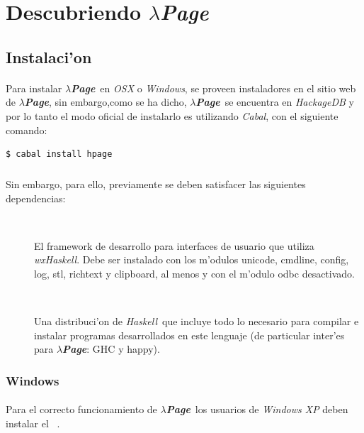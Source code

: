 \documentclass[a4paper]{article}
\newcommand{\haskell}{\textsl{Haskell}}
\newcommand{\hpage}{\textbf{\textsl{$\lambda$Page}}}
\newcommand{\cabal}{\textsl{Cabal}}
\begin{document}
\section{Descubriendo \hpage}
\subsection{Instalaci'on}
\begin{epigraphs}
\end{epigraphs}
\paragraph{}Para instalar \hpage\ en \textsl{OSX} o \textsl{Windows}, se proveen instaladores en el sitio web de \hpage, sin embargo,como se ha dicho, \hpage\ se encuentra en \textsl{HackageDB} y por lo tanto el modo oficial de instalarlo es utilizando \cabal, con el siguiente comando:
\lstset{language=sh, frame=single, tabsize=2}
\begin{lstlisting}
$ cabal install hpage
\end{lstlisting}
\subparagraph{}Sin embargo, para ello, previamente se deben satisfacer las siguientes dependencias:
\begin{description}
	\item[~\cite{wxwidgets}] El framework de desarrollo para interfaces de usuario que utiliza \textsl{wxHaskell}.  Debe ser instalado con los m'odulos unicode, cmdline, config, log, stl, richtext y clipboard, al menos y con el m'odulo odbc desactivado.
	\item[~\cite{platform}] Una distribuci'on de \haskell\ que incluye todo lo necesario para compilar e instalar programas desarrollados en este lenguaje (de particular inter'es para \hpage: GHC y happy).
\end{description}
\subsubsection{Windows}
\paragraph{}Para el correcto funcionamiento de \hpage\ los usuarios de \textsl{Windows XP} deben instalar el ~\cite{cppsp1}.
\end{document}
